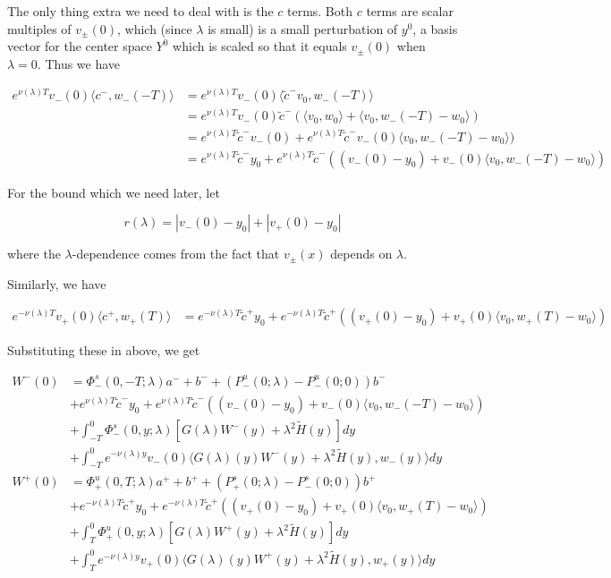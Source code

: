 \documentclass[12pt]{article}
\begin{document}
\begin{enumerate}
The only thing extra we need to deal with is the $c$ terms. Both $c$ terms are scalar multiples of $v_\pm(0)$, which (since $\lambda$ is small) is a small perturbation of $y^0$, a basis vector for the center space $Y^0$ which is scaled so that it equals $v_\pm(0)$ when $\lambda = 0$. Thus we have

\begin{align*}
e^{\nu(\lambda)T} v_-(0) \langle c^-, w_-(-T) \rangle &= e^{\nu(\lambda)T} v_-(0) \langle \tilde{c}^- v_0, w_-(-T) \rangle \\
&= e^{\nu(\lambda)T} v_-(0) \tilde{c}^- (\langle  v_0, w_0 \rangle + \langle  v_0, w_-(-T) - w_0 \rangle) \\
&= e^{\nu(\lambda)T} \tilde{c}^- v_-(0) + e^{\nu(\lambda)T} \tilde{c}^- v_-(0)  \langle  v_0, w_-(-T) - w_0 \rangle) \\
&= e^{\nu(\lambda)T} \tilde{c}^- y_0 + e^{\nu(\lambda)T} \tilde{c}^- ( (v_-(0) - y_0) + v_-(0) \langle  v_0, w_-(-T) - w_0 \rangle)
\end{align*}

For the bound which we need later, let

\[
r(\lambda) = |v_-(0) - y_0| + |v_+(0) - y_0|
\]

where the $\lambda$-dependence comes from the fact that $v_\pm(x)$ depends on $\lambda$.

Similarly, we have

\begin{align*}
e^{-\nu(\lambda)T} v_+(0) \langle c^+, w_+(T) \rangle &= e^{-\nu(\lambda)T} \tilde{c}^+ y_0 + e^{-\nu(\lambda)T} \tilde{c}^+ ( (v_+(0) - y_0) + v_+(0) \langle  v_0, w_+(T) - w_0 \rangle)
\end{align*}

Substituting these in above, we get

\begin{align*}
W^-(0) &= \Phi^s_-(0, -T; \lambda )a^- + b^- + (P^u_-(0; \lambda) - P^u_-(0; 0))b^- \\
&+ e^{\nu(\lambda)T} \tilde{c}^- y_0 + e^{\nu(\lambda)T} \tilde{c}^- ( (v_-(0) - y_0) + v_-(0) \langle  v_0, w_-(-T) - w_0 \rangle) \\
&+ \int_{-T}^0 \Phi^s_-(0, y; \lambda) [ G(\lambda)W^-(y) + \lambda^2 \tilde{H}(y) ] dy \\
&+ \int_{-T}^0 
e^{-\nu(\lambda)y} v_-(0) \langle G(\lambda)(y)W^-(y) + \lambda^2 \tilde{H}(y), w_-(y) \rangle dy \\
W^+(0) &= \Phi^u_+(0, T; \lambda)a^+ + b^+ + (P^s_+(0; \lambda) - P^s_-(0; 0))b^+ \\
&+ e^{-\nu(\lambda)T} \tilde{c}^+ y_0 + e^{-\nu(\lambda)T} \tilde{c}^+ ( (v_+(0) - y_0) + v_+(0) \langle  v_0, w_+(T) - w_0 \rangle) \\
&+ \int_T^0 \Phi^u_+(0, y; \lambda) [ G(\lambda)W^+(y) + \lambda^2 \tilde{H}(y) ] dy \\
&+ \int_T^0 e^{-\nu(\lambda)y} v_+(0) \langle G(\lambda)(y)W^+(y) + \lambda^2 \tilde{H}(y), w_+(y) \rangle dy
\end{align*}


\end{enumerate}
\end{document}
